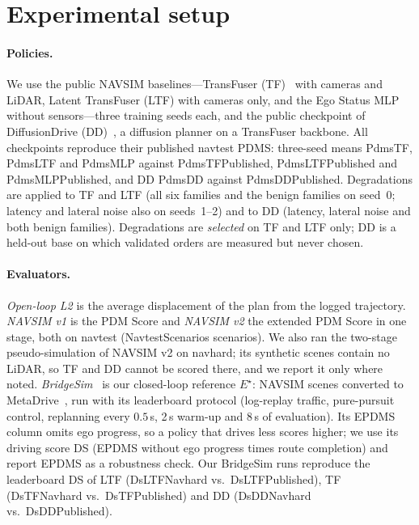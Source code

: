 \section{Experimental setup}
\label{sec:setup}

\paragraph{Policies.}
We use the public NAVSIM baselines---TransFuser (TF)~\cite{chitta2023transfuser} with cameras and
LiDAR, Latent TransFuser (LTF) with cameras only, and the Ego Status MLP without sensors---three
training seeds each, and the public checkpoint of DiffusionDrive (DD)~\cite{liao2025diffusiondrive}, a
diffusion planner on a TransFuser backbone.
All checkpoints reproduce their published navtest PDMS: three-seed means \num{PdmsTF}, \num{PdmsLTF}
and \num{PdmsMLP} against \num{PdmsTFPublished}, \num{PdmsLTFPublished} and \num{PdmsMLPPublished},
and DD \num{PdmsDD} against \num{PdmsDDPublished}.
Degradations are applied to TF and LTF (all six families and the benign families on seed~0; latency and
lateral noise also on seeds~1--2) and to DD (latency, lateral noise and both benign families).
Degradations are \emph{selected} on TF and LTF only; DD is a held-out base on which validated orders
are measured but never chosen.

\paragraph{Evaluators.}
\emph{Open-loop L2} is the average displacement of the plan from the logged trajectory.
\emph{NAVSIM v1} is the PDM Score and \emph{NAVSIM v2} the extended PDM Score in one stage, both on
navtest (\num{NavtestScenarios} scenarios).
We also ran the two-stage pseudo-simulation of NAVSIM v2 on navhard; its synthetic scenes contain no
LiDAR, so TF and DD cannot be scored there, and we report it only where noted.
\emph{BridgeSim}~\cite{zhao2026bridgesim} is our closed-loop reference $E^\star$: NAVSIM scenes
converted to MetaDrive~\cite{li2022metadrive}, run with its leaderboard protocol (log-replay traffic,
pure-pursuit control, replanning every $0.5$\,s, 2\,s warm-up and 8\,s of evaluation).
Its EPDMS column omits ego progress, so a policy that drives less scores higher; we use its driving
score DS (EPDMS without ego progress times route completion) and report EPDMS as a robustness check.
Our BridgeSim runs reproduce the leaderboard DS of LTF (\num{DsLTFNavhard} vs.\ \num{DsLTFPublished}),
TF (\num{DsTFNavhard} vs.\ \num{DsTFPublished}) and DD (\num{DsDDNavhard} vs.\ \num{DsDDPublished}).


